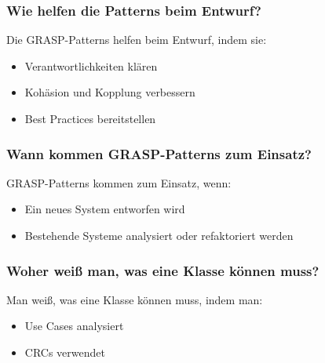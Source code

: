 \documentclass[main.tex]{subfiles}
\begin{document}
\subsubsection*{Wie helfen die Patterns beim Entwurf?}
Die \gls{GRASP-Pattern}s helfen beim Entwurf, indem sie:
\begin{itemize}
    \item Verantwortlichkeiten klären
    \item \gls{Kohäsion} und \gls{Kopplung} verbessern
    \item Best Practices bereitstellen
\end{itemize}

\subsubsection*{Wann kommen \gls{GRASP-Pattern}s zum Einsatz?}
\gls{GRASP-Pattern}s kommen zum Einsatz, wenn:
\begin{itemize}
    \item Ein neues System entworfen wird
    \item Bestehende Systeme analysiert oder refaktoriert werden
\end{itemize}

\subsubsection*{Woher weiß man, was eine Klasse können muss?}
Man weiß, was eine Klasse können muss, indem man:
\begin{itemize}
    \item \glspl{Use Case} analysiert
    \item \glspl{CRC} verwendet
\end{itemize}
\end{document}
